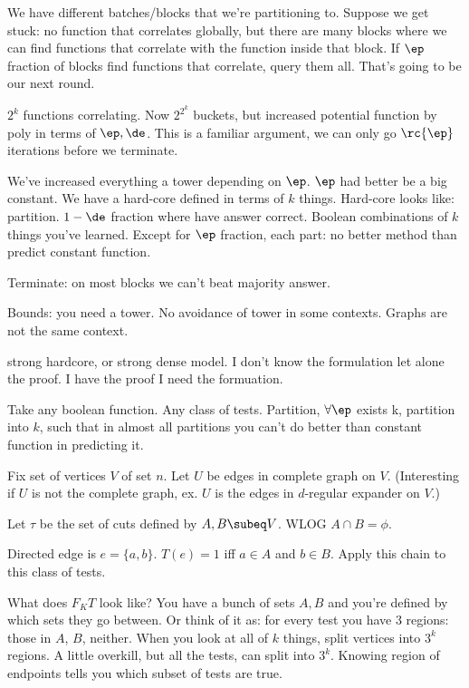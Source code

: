 We have different batches/blocks that we're partitioning to. Suppose we get stuck: no function that correlates globally, but there are many blocks where we can find functions that correlate with the function inside that block. If $\ep$ fraction of blocks find functions that correlate, query them all. That's going to be our next round.

$2^k$ functions correlating. Now $2^{2^k}$ buckets, but increased potential function by poly in terms of $\ep,\de$. This is a familiar argument, we can only go $\rc{\ep}$ iterations before we terminate. 

We've increased everything a tower depending on $\ep$. $\ep$ had better be a big constant. We have a hard-core defined in terms of $k$ things. Hard-core looks like: partition. $1-\de$ fraction where have answer correct. Boolean combinations of $k$ things you've learned. Except for $\ep$ fraction, each part: no better method than predict constant function.

Terminate: on most blocks we can't beat majority answer.

Bounds: you need a tower. No avoidance of tower in some contexts.
Graphs are not the same context.

strong hardcore, or strong dense model. 
I don't know the formulation let alone the proof. I have the proof I need the formuation.

Take any boolean function. Any class of tests. Partition, $\forall \ep$ exists k, partition into $k$, such that in almost all partitions you can't do better than constant function in predicting it.

Fix set of vertices $V$ of set $n$. Let $U$ be edges in complete graph on $V$.
(Interesting if $U$ is not the complete graph, ex. $U$ is the edges in $d$-regular expander on $V$.)

Let $\tau$ be the set of cuts defined by $A,B\subeq V$. WLOG $A\cap B=\phi$.

Directed edge is $e=\{a,b\}$. $T(e) = 1$ iff $a\in A$ and $b\in B$. Apply this chain to this class of tests. 

What does $F_KT$ look like? You have a bunch of sets $A,B$ and you're defined by which sets they go between. Or think of it as: for every test you have 3 regions: those in $A$, $B$, neither. When you look at all of $k$ things, split vertices into $3^k$ regions. A little overkill, but all the tests, can split into $3^k$. Knowing region of endpoints tells you which subset of tests are true. 

